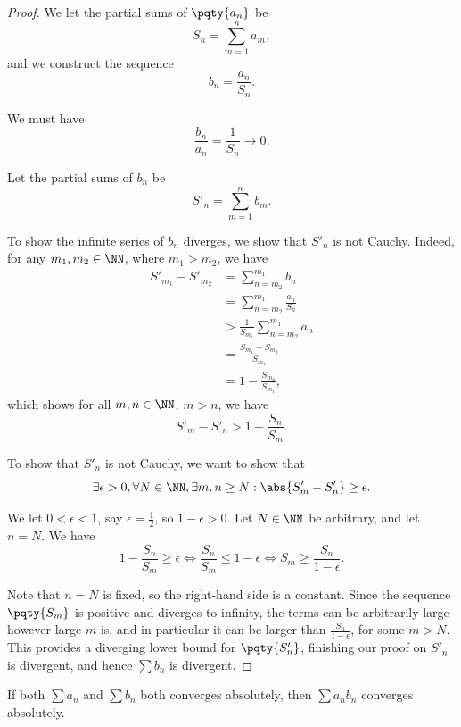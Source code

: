\begin{proof}
        We let the partial sums of \(\pqty{a_n}\) be
    \[
        S_n = \sum_{m = 1}^{n} a_m,
    \]
    and we construct the sequence
    \[
        b_n = \frac{a_n}{S_n}.
    \]

    We must have
    \[
        \frac{b_n}{a_n} = \frac{1}{S_n} \to 0.
    \]

    Let the partial sums of \(b_n\) be
    \[
        S'_n = \sum_{m = 1}^{n} b_m.
    \]

    To show the infinite series of \(b_n\) diverges, we show that \(S'_n\) is not Cauchy. Indeed, for any \(m_1, m_2 \in \NN\), where \(m_1 > m_2\), we have
    \begin{align*}
        S'_{m_1} - S'_{m_2} &= \sum_{n = m_2}^{m_1} b_n \\
        &= \sum_{n = m_2}^{m_1} \frac{a_n}{S_n} \\
        &> \frac{1}{S_{m_1}} \sum_{n = m_2}^{m_1} a_n \\
        &= \frac{S_{m_1} - S_{m_2}}{S_{m_1}} \\
        &= 1 - \frac{S_{m_2}}{S_{m_1}},
    \end{align*}
    which shows for all \(m, n \in \NN\), \(m > n\), we have
    \[
        S'_{m} - S'_{n} > 1 - \frac{S_n}{S_m}.
    \]

    To show that \(S'_n\) is not Cauchy, we want to show that
    \[
        \exists \epsilon > 0, \forall N \in \NN, \exists m, n \geq N : \abs{S'_m - S'_n} \geq \epsilon.
    \]

    We let \(0 < \epsilon < 1\), say \(\epsilon = \frac{1}{2}\), so \(1 - \epsilon > 0\). Let \(N \in \NN\) be arbitrary, and let \(n = N\). We have
    \[
        1 - \frac{S_n}{S_m} \geq \epsilon \iff \frac{S_n}{S_m} \leq 1 - \epsilon \iff S_m \geq \frac{S_n}{1 - \epsilon}.
    \]

    Note that \(n = N\) is fixed, so the right-hand side is a constant. Since the sequence \(\pqty{S_m}\) is positive and diverges to infinity, the terms can be arbitrarily large however large \(m\) is, and in particular it can be larger than \(\frac{S_n}{1 - \epsilon}\), for some \(m > N\). This provides a diverging lower bound for \(\pqty{S'_n}\), finishing our proof on \(S'_n\) is divergent, and hence \(\sum b_n\) is divergent.
\end{proof}

\begin{proposition}
    If both \(\sum a_n\) and \(\sum b_n\) both converges absolutely, then \(\sum a_n b_n\) converges absolutely.
\end{proposition}

